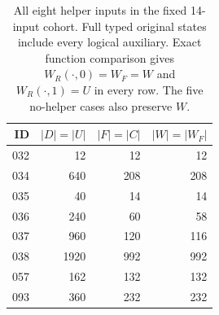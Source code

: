 \begin{table}[t]
\centering
\caption{All eight helper inputs in the fixed 14-input cohort.
Full typed original states include every logical auxiliary.
Exact function comparison gives $W_R(\cdot,0)=W_F=W$ and
$W_R(\cdot,1)=U$ in every row. The five no-helper cases also
preserve $W$.}
\label{tab:helper-decomposition}
\small
\begin{tabular}{@{}rrrr@{}}
\toprule
ID & $|D|=|U|$ & $|F|=|C|$ & $|W|=|W_F|$\\
\midrule
032 & 12 & 12 & 12\\
034 & 640 & 208 & 208\\
035 & 40 & 14 & 14\\
036 & 240 & 60 & 58\\
037 & 960 & 120 & 116\\
038 & 1920 & 992 & 992\\
057 & 162 & 132 & 132\\
093 & 360 & 232 & 232\\
\bottomrule
\end{tabular}
\end{table}
